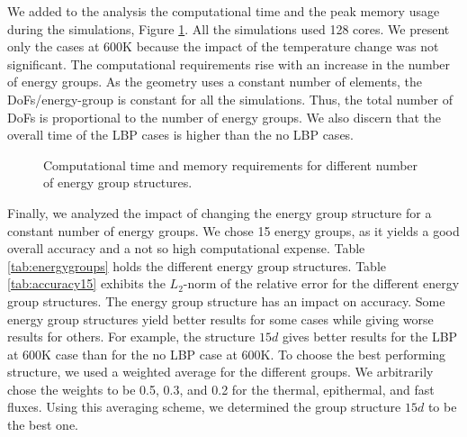 We added to the analysis the computational time and the peak memory usage during the simulations, Figure \ref{fig:assembly-time}.
All the simulations used 128 cores.
We present only the cases at 600K because the impact of the temperature change was not significant.
The computational requirements rise with an increase in the number of energy groups.
As the geometry uses a constant number of elements, the DoFs/energy-group is constant for all the simulations.
Thus, the total number of DoFs is proportional to the number of energy groups.
We also discern that the overall time of the LBP cases is higher than the no LBP cases.

\begin{figure}[htbp!]
	\centering
	\hfill
	\caption{Computational time and memory requirements for different number of energy group structures.}
	\label{fig:assembly-time}
\end{figure}

Finally, we analyzed the impact of changing the energy group structure for a constant number of energy groups.
We chose 15 energy groups, as it yields a good overall accuracy and a not so high computational expense.
Table \ref{tab:energygroups} holds the different energy group structures.
Table \ref{tab:accuracy15} exhibits the $L_2$-norm of the relative error for the different energy group structures.
The energy group structure has an impact on accuracy.
Some energy group structures yield better results for some cases while giving worse results for others.
For example, the structure $15d$ gives better results for the LBP at 600K case than for the no LBP case at 600K.
To choose the best performing structure, we used a weighted average for the different groups.
We arbitrarily chose the weights to be 0.5, 0.3, and 0.2 for the thermal, epithermal, and fast fluxes.
Using this averaging scheme, we determined the group structure $15d$ to be the best one.

